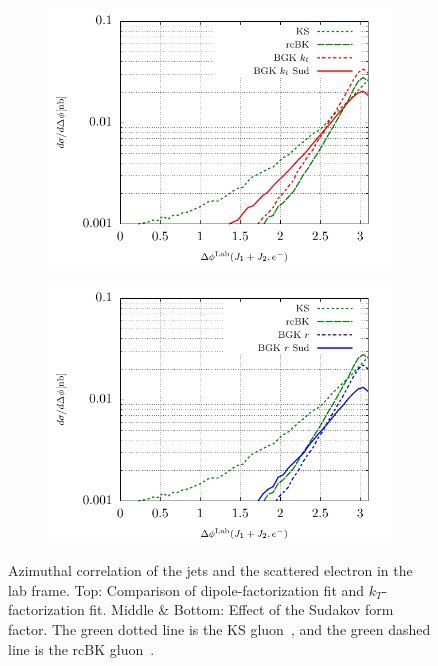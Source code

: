 \documentclass[11pt]{article}
\begin{document}
\begin{figure}[p]
	\begin{subfigure}{0.5\textwidth}
		\includegraphics[width=\textwidth]{plots/plotBGK2Lab}
	\end{subfigure}
	\begin{subfigure}{0.5\textwidth}
		\includegraphics[width=\textwidth]{plots/plotBGK3Lab}
	\end{subfigure}
\caption{ Azimuthal correlation of the jets and the scattered electron in the lab frame. Top: Comparison of dipole-factorization fit and $k_T$-factorization fit. Middle \& Bottom: Effect of the Sudakov form factor. The green dotted line is the KS gluon~\cite{vanHameren:2021sqc}, and the green dashed line is the rcBK gluon~\cite{Albacete:2010sy}.}
\label{fig:je-lab}
\end{figure}
\end{document}
